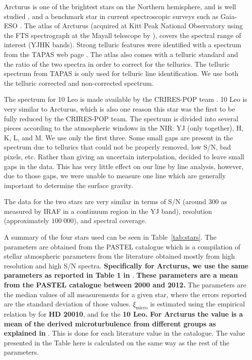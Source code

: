 \documentclass{aa}
\begin{document}
Arcturus is one of the brightest stars on the Northern hemisphere, and is well
studied \citep[see e.g.][to mention just a
few]{Griffin1967,McWilliam1990,Ramirez2013}, and a benchmark star in
current spectroscopic surveys such as Gaia-ESO \citep{Jofre2014,Smiljanic2014}.
The atlas of Arcturus (acquired at Kitt Peak National Observatory using the FTS
spectrograph at the Mayall telescope by \citet{Hinkle1995a}), covers the
spectral range of interest (YJHK bands). Strong telluric features were
identified with a spectrum from the TAPAS web page \citep{Bertaux2014}. The
atlas also comes with a telluric standard and the ratio of the two spectra in
order to correct for the tellurics. The telluric spectrum from TAPAS is only
used for telluric line identification. We use both the telluric corrected and
non-corrected spectrum.

The spectrum for 10 Leo is made available by the CRIRES-POP team
\citep{Nicholls2017}. 10 Leo is very similar to Arcturus, which is also one
reason this star was the first to be fully reduced by the CRIRES-POP team. The
spectrum is divided into several pieces according to the atmospheric windows in
the NIR: YJ (only together), H, K, L, and M. We use only the first three. Some
small gaps are present in the spectrum due to tellurics that could not be
properly removed, low S/N, bad pixels, etc. Rather than giving an uncertain
interpolation, \citet{Nicholls2017} decided to leave small gaps in the data.
This has very little effect on our line by line analysis, however, due to those
gaps, we were unable to measure one  line which are generally
important to determine the surface gravity.

The data for the two stars are very similar in terms of S/N (around 300 as
measured by IRAF in a continuum region in the YJ band), resolution
(approximately $100\;000$), and spectral coverage.

A summary of the four stars used can be seen in Table~\ref{tab:stars}. The parameters are obtained
from the PASTEL catalogue \citep{Soubiran2016} which is a compilation of stellar atmospheric
parameters from the literature obtained mostly from high resolution and high S/N spectra. {\bf
Specifically for Arcturus, we use the same parameters as reported in Table 1 in} \citet{Jofre2014}.
{\bf These parameters are a mean from the PASTEL catalogue between 2000 and 2012.} The parameters
are the median values of all measurements for a given star, where the errors reported are the
standard deviation of those values. $\xi_\mathrm{micro}$ is estimated using the empirical relation
by \citet{Tsantaki2013} for {\bf HD 20010}, and \citet{Adibekyan2015} for the {\bf 10 Leo. For
Arcturus the value is a mean of the derived microturbulence from different groups as explained in}
\citet{Jofre2014}. This is done for each literature value in the catalogue. The value presented in
the Table here is calculated on the same way as the rest of the parameters.
\end{document}
